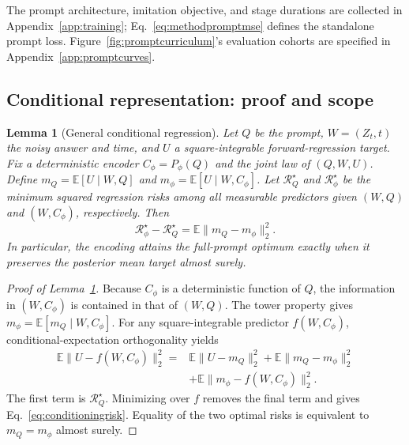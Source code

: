 \documentclass{article}
\newcommand{\E}{\mathbb{E}}
\newtheorem{lemma}{Lemma}
\begin{document}
The prompt architecture, imitation objective, and stage durations are collected in Appendix~\ref{app:training}; Eq.~\eqref{eq:methodpromptmse} defines the standalone prompt loss. Figure~\ref{fig:promptcurriculum}'s evaluation cohorts are specified in Appendix~\ref{app:promptcurves}.

\subsection{Conditional representation: proof and scope}
\label{app:conditioninglemma}

\begin{lemma}[General conditional regression]
\label{lem:conditionalregression}
Let $Q$ be the prompt, $W=(Z_t,t)$ the noisy answer and time, and $U$ a square-integrable forward-regression target. Fix a deterministic encoder $C_\phi=P_\phi(Q)$ and the joint law of $(Q,W,U)$. Define $m_Q=\E[U\mid W,Q]$ and $m_\phi=\E[U\mid W,C_\phi]$. Let $\mathcal R_Q^\star$ and $\mathcal R_\phi^\star$ be the minimum squared regression risks among all measurable predictors given $(W,Q)$ and $(W,C_\phi)$, respectively. Then
\begin{equation}
 \mathcal R_\phi^\star-\mathcal R_Q^\star
 =\E\|m_Q-m_\phi\|_2^2.
 \label{eq:conditioningrisk}
\end{equation}
In particular, the encoding attains the full-prompt optimum exactly when it preserves the posterior mean target almost surely.
\end{lemma}

\begin{proof}[Proof of Lemma~\ref{lem:conditionalregression}]
Because $C_\phi$ is a deterministic function of $Q$, the information in $(W,C_\phi)$ is contained in that of $(W,Q)$. The tower property gives $m_\phi=\E[m_Q\mid W,C_\phi]$. For any square-integrable predictor $f(W,C_\phi)$, conditional-expectation orthogonality yields
\begin{equation}
\begin{split}
 \E\|U-f(W,C_\phi)\|_2^2
 ={}&\E\|U-m_Q\|_2^2+\E\|m_Q-m_\phi\|_2^2\\
 &+\E\|m_\phi-f(W,C_\phi)\|_2^2.
\end{split}
\label{eq:conditioningdecomposition}
\end{equation}
The first term is $\mathcal R_Q^\star$. Minimizing over $f$ removes the final term and gives Eq.~\eqref{eq:conditioningrisk}. Equality of the two optimal risks is equivalent to $m_Q=m_\phi$ almost surely.
\end{proof}
\end{document}
